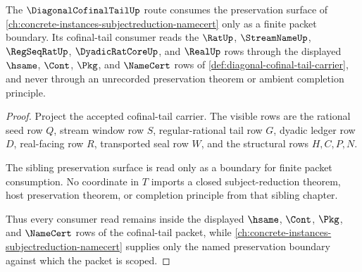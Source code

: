\begin{theorem}
\label{thm:diagonal-cofinal-tail-primitive-scope}
The $\DiagonalCofinalTailUp$ route consumes the preservation surface of \autoref{ch:concrete-instances-subjectreduction-namecert} only as a finite packet boundary. Its cofinal-tail consumer reads the $\RatUp$, $\StreamNameUp$, $\RegSeqRatUp$, $\DyadicRatCoreUp$, and $\RealUp$ rows through the displayed $\hsame$, $\Cont$, $\Pkg$, and $\NameCert$ rows of \autoref{def:diagonal-cofinal-tail-carrier}, and never through an unrecorded preservation theorem or ambient completion principle.
\end{theorem}
\begin{proof}
Project the accepted cofinal-tail carrier. The visible rows are the rational seed row $Q$, stream window row $S$, regular-rational tail row $G$, dyadic ledger row $D$, real-facing row $R$, transported seal row $W$, and the structural rows $H,C,P,N$.

The sibling preservation surface is read only as a boundary for finite packet consumption. No coordinate in $T$ imports a closed subject-reduction theorem, host preservation theorem, or completion principle from that sibling chapter.

Thus every consumer read remains inside the displayed $\hsame$, $\Cont$, $\Pkg$, and $\NameCert$ rows of the cofinal-tail packet, while \autoref{ch:concrete-instances-subjectreduction-namecert} supplies only the named preservation boundary against which the packet is scoped.
\end{proof}

